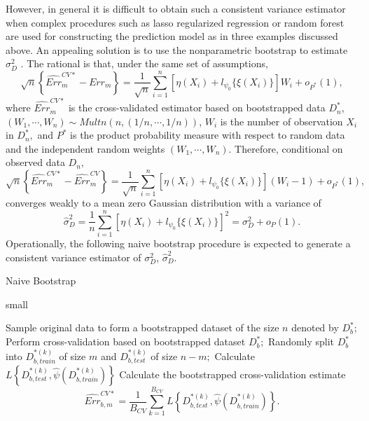 \documentclass[12pt]{article}
\begin{document}
However, in general it is difficult to obtain such a consistent variance estimator when complex procedures such as lasso regularized regression or random forest are used for constructing the prediction model as in three examples discussed above. An appealing solution is to use the nonparametric bootstrap to estimate $\sigma_D^2$ \cite{davison1997bootstrap, efron1994introduction}. The rational is that, under the same set of assumptions, 
$$\sqrt{n}\left\{\widehat{Err}^{CV*}_m-Err_m\right\}=\frac{1}{\sqrt{n}}\sum_{i=1}^n \left[\eta(X_i)+l_{\psi_0}\{\xi(X_i)\} \right]W_i+o_{P^*}(1),$$
where $\widehat{Err}^{CV*}_m$ is the cross-validated estimator based on bootstrapped data $D^*_n$, $(W_1, \cdots, W_n)\sim Multn\left(n, (1/n, \cdots, 1/n)\right)$, $W_i$ is the number of observation $X_i$ in $D^*_n,$
and $P^*$ is the product probability measure with respect to random data and the independent random weights $(W_1,\cdots, W_n).$ Therefore, conditional on observed data $D_n,$
$$\sqrt{n}\left\{\widehat{Err}^{CV*}_m-\widehat{Err}^{CV}_m\right\}=\frac{1}{\sqrt{n}}\sum_{i=1}^n \left[\eta(X_i)+l_{\psi_0}\{\xi(X_i)\} \right](W_i-1)+o_{P^*}(1),$$
converges weakly to a mean zero Gaussian distribution with a variance of 
$$\hat{\sigma}^2_D=\frac{1}{n}\sum_{i=1}^n\left[\eta(X_i)+l_{\psi_0}\{\xi(X_i)\} \right]^2=\sigma_D^2+o_P(1).$$
Operationally, the following naive bootstrap procedure is expected to generate a consistent variance estimator of $\sigma_D^2$, $\hat{\sigma}_D^2.$
\begin{algorithm}[h!]
  \caption{Naive Bootstrap}\label{NB}
  {small
  \begin{algorithmic}[1]
        \State Sample original data to form a bootstrapped dataset of the size $n$ denoted by $D_b^*;$
        \State Perform cross-validation based on bootstrapped dataset $D_b^*;$
        \State Randomly split $D^*_b$ into $D^{*(k)}_{b,train}$ of size $m$ and $D^{*(k)}_{b, test}$ of size $n-m;$
        \State Calculate $L\left\{D_{b, test}^{*(k)}, \hat{\psi}(D_{b, train}^{*(k)})\right\}$
      \EndFor
      \State      Calculate the bootstrapped cross-validation estimate 
$$\widehat{Err}_{b,m}^{CV*}=\frac{1}{B_{CV}}\sum_{k=1}^{B_{CV}}L\left\{D_{b, test}^{*(k)}, \hat{\psi}(D_{b, train}^{*(k)})\right\}.$$
      \EndFor
\end{algorithmic}
}
\end{algorithm}
\end{document}
